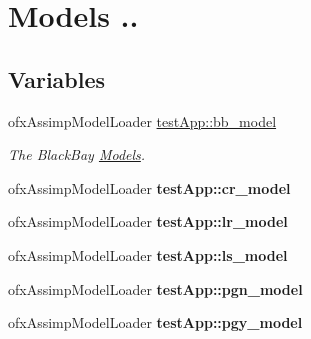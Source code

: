 \hypertarget{group___assimp_model_loader}{\section{Models ..}
\label{group___assimp_model_loader}
}
\subsection*{Variables}
\begin{DoxyCompactItemize}
\item 
\hypertarget{group___assimp_model_loader_ga55051db1203331adb5556373b1f93194}{ofx\-Assimp\-Model\-Loader \hyperlink{group___assimp_model_loader_ga55051db1203331adb5556373b1f93194}{test\-App\-::bb\-\_\-model}}\label{group___assimp_model_loader_ga55051db1203331adb5556373b1f93194}

\begin{DoxyCompactList}\small\item\em The Black\-Bay \hyperlink{class_models}{Models}. \end{DoxyCompactList}\item 
\hypertarget{group___assimp_model_loader_ga0226f29cac900da4a7d1a698b1b5b9d3}{ofx\-Assimp\-Model\-Loader {\bfseries test\-App\-::cr\-\_\-model}}\label{group___assimp_model_loader_ga0226f29cac900da4a7d1a698b1b5b9d3}

\item 
\hypertarget{group___assimp_model_loader_ga75d1f2c61d9e27b0f639a2632de94ed0}{ofx\-Assimp\-Model\-Loader {\bfseries test\-App\-::lr\-\_\-model}}\label{group___assimp_model_loader_ga75d1f2c61d9e27b0f639a2632de94ed0}

\item 
\hypertarget{group___assimp_model_loader_gab7fc48fde55ff01601e7ec704685fda7}{ofx\-Assimp\-Model\-Loader {\bfseries test\-App\-::ls\-\_\-model}}\label{group___assimp_model_loader_gab7fc48fde55ff01601e7ec704685fda7}

\item 
\hypertarget{group___assimp_model_loader_ga80f171a105bccdb3e505d438462d089a}{ofx\-Assimp\-Model\-Loader {\bfseries test\-App\-::pgn\-\_\-model}}\label{group___assimp_model_loader_ga80f171a105bccdb3e505d438462d089a}

\item 
\hypertarget{group___assimp_model_loader_gaf98c6967c563936d418bf048a7d392b7}{ofx\-Assimp\-Model\-Loader {\bfseries test\-App\-::pgy\-\_\-model}}\label{group___assimp_model_loader_gaf98c6967c563936d418bf048a7d392b7}


\end{DoxyCompactItemize}
